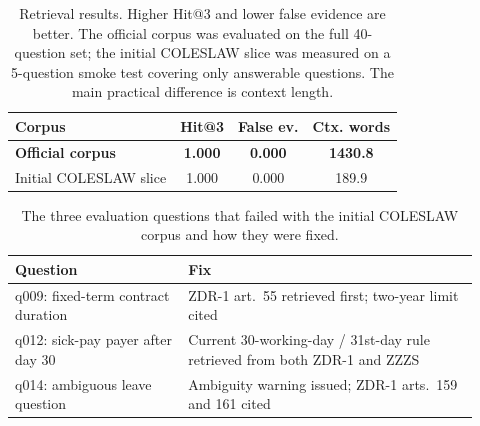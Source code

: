 \documentclass[fleqn,moreauthors,10pt]{ds_report}
\begin{document}
\begin{table}[ht]
\caption{Retrieval results. Higher Hit@3 and lower false evidence are better. The official corpus was evaluated on the full 40-question set; the initial COLESLAW slice was measured on a 5-question smoke test covering only answerable questions. The main practical difference is context length.}
\centering
\small
\begin{tabular}{lccc}
\toprule
\textbf{Corpus} & \textbf{Hit@3} & \textbf{False ev.} & \textbf{Ctx. words} \\
\midrule
\textbf{Official corpus} & \textbf{1.000} & \textbf{0.000} & \textbf{1430.8} \\
Initial COLESLAW slice & 1.000 & 0.000 & 189.9 \\
\bottomrule
\end{tabular}
\label{tab:retrieval}
\end{table}

\begin{table}[ht]
\caption{Answer quality on the 40-question set. Baseline rows have no retrieved context. All rows use the strict system prompt (strict\_legal\_rag\_sl\_v3) and temperature 0. GaMS-2B is the Slovenian GaMS-2B-Instruct model evaluated with the same corpus and prompt as Mistral. Correctness and hallucination are 0--5; citations and refusal are fractions.}
\centering
{}
\label{tab:answers}
\end{table}

\begin{table}[ht]
\caption{The three evaluation questions that failed with the initial COLESLAW corpus and how they were fixed.}
\centering
\small
\begin{tabular}{@{}p{0.34\linewidth}p{0.58\linewidth}@{}}
\toprule
\textbf{Question} & \textbf{Fix} \\
\midrule
q009: fixed-term contract duration & ZDR-1 art.\ 55 retrieved first; two-year limit cited \\
q012: sick-pay payer after day 30 & Current 30-working-day / 31st-day rule retrieved from both ZDR-1 and ZZZS \\
q014: ambiguous leave question & Ambiguity warning issued; ZDR-1 arts.\ 159 and 161 cited \\
\bottomrule
\end{tabular}
\label{tab:regression}
\end{table}
\end{document}
